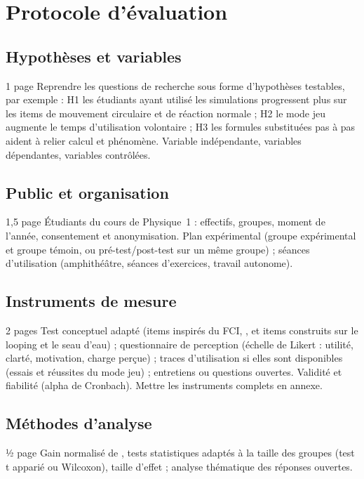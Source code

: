 
\chapter{Protocole d'évaluation}
\label{chap:protocole}

\section{Hypothèses et variables}

\begin{arediger}{1 page}
Reprendre les questions de recherche sous forme d'hypothèses testables, par
exemple : H1 les étudiants ayant utilisé les simulations progressent plus sur
les items de mouvement circulaire et de réaction normale ; H2 le mode jeu
augmente le temps d'utilisation volontaire ; H3 les formules substituées pas à
pas aident à relier calcul et phénomène. Variable indépendante, variables
dépendantes, variables contrôlées.
\end{arediger}

\section{Public et organisation}

\begin{arediger}{1,5 page}
Étudiants du cours de Physique~1 : effectifs, groupes, moment de l'année,
consentement et anonymisation. Plan expérimental (groupe expérimental et
groupe témoin, ou pré-test/post-test sur un même groupe) ; séances
d'utilisation (amphithéâtre, séances d'exercices, travail autonome).
\end{arediger}

\section{Instruments de mesure}

\begin{arediger}{2 pages}
Test conceptuel adapté (items inspirés du FCI, \cite{hestenes1992fci}, et
items construits sur le looping et le seau d'eau) ; questionnaire de
perception (échelle de Likert : utilité, clarté, motivation, charge
perçue) ; traces d'utilisation si elles sont disponibles (essais et
réussites du mode jeu) ; entretiens ou questions ouvertes. Validité et
fiabilité (alpha de Cronbach). Mettre les instruments complets en annexe.
\end{arediger}

\section{Méthodes d'analyse}

\begin{arediger}{½ page}
Gain normalisé de \textcite{hake1998}, tests statistiques adaptés à la taille
des groupes (test t apparié ou Wilcoxon), taille d'effet ; analyse
thématique des réponses ouvertes.
\end{arediger}
